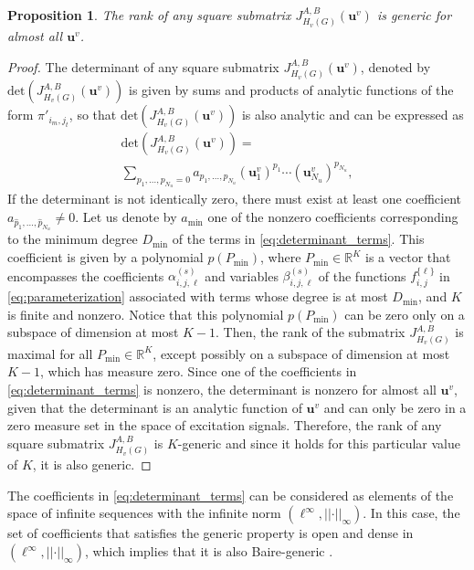 \documentclass[letterpaper,10pt,journal]{IEEEtran}
\newcommand{\uu}{\mathbf{u}}
\newcommand{\detm}{\text{det}}
\newtheorem{proposition}{Proposition}
\newcommand{\abs}[1]{\left|#1\right|}
\newcommand{\norm}[1]{\abs{\abs{#1}}}
\newcommand{\R}{\mathbb R}
\begin{document}
\begin{proposition}\label{prop:generic_rank_submatrix}
    The rank of any square submatrix $J_{H_v(G)}^{A,B}(\uu^v)$ is generic for almost all $\uu^v$.
\end{proposition}
\begin{proof}
    The determinant of any square submatrix $J_{H_v(G)}^{A,B}(\uu^v)$, denoted by $\detm(J_{H_v(G)}^{A,B}(\uu^v))$ is given by sums and products of analytic functions of the form $\pi'_{i_m,j_t}$, so that $\detm(J_{H_v(G)}^{A,B}(\uu^v))$ is also analytic and can be expressed as
\begin{multline}\label{eq:determinant_terms}
\detm(J_{H_v(G)}^{A,B}(\uu^v))=\\
\sum_{p_1,\ldots,p_{N_u}=0} a_{p_1,\ldots,p_{N_u}}(\uu^v_1)^{p_1}\cdots (\uu^v_{N_u})^{p_{N_u}},
\end{multline}
If the determinant is not identically zero, there must exist at least one coefficient $a_{\hat p_1,\ldots,\hat p_{N_u}}\neq 0$. Let us denote by $a_{\min}$ one of the nonzero coefficients corresponding to the minimum degree $D_{\min}$ of the terms in \eqref{eq:determinant_terms}. This coefficient is given  by a polynomial $p(P_{\min})$, where $P_{\min}\in\R^K$ is a vector that encompasses the coefficients $\alpha_{i,j,\ell}^{(s)}$ and variables $\beta_{i,j,\ell}^{(s)}$ of the functions $f_{i,j}^{\{\ell\}}$ in \eqref{eq:parameterization} associated with terms whose degree is at most $D_{\min}$, and $K$ is finite and nonzero. 
Notice that this polynomial   $p(P_{\min})$ can be zero only on a subspace of dimension at most $K-1$. Then, the rank of the submatrix $J_{H_v(G)}^{A,B}$ is maximal for all $P_{\min}\in\R^{K}$, except possibly on a subspace of dimension at most $K-1$, which has measure zero. Since one of the coefficients in \eqref{eq:determinant_terms} is nonzero, the determinant is nonzero for almost all $\uu^v$, given that the determinant is an analytic function of $\uu^v$ and can only be zero in a zero measure set in the space of excitation signals. Therefore, the rank of any square submatrix $J_{H_v(G)}^{A,B}$ is $K$-generic and since it holds for this particular value of $K$, it is also generic. 
\end{proof}
The coefficients in \eqref{eq:determinant_terms} can be considered as elements of the space of infinite sequences with the infinite norm $(\ell^\infty,\norm{\cdot}_\infty)$. In this case, the set of coefficients that satisfies the generic property is open and dense in $(\ell^\infty,\norm{\cdot}_\infty)$, which implies that it is also Baire-generic \cite{oxtoby1980measure}.
\end{document}
